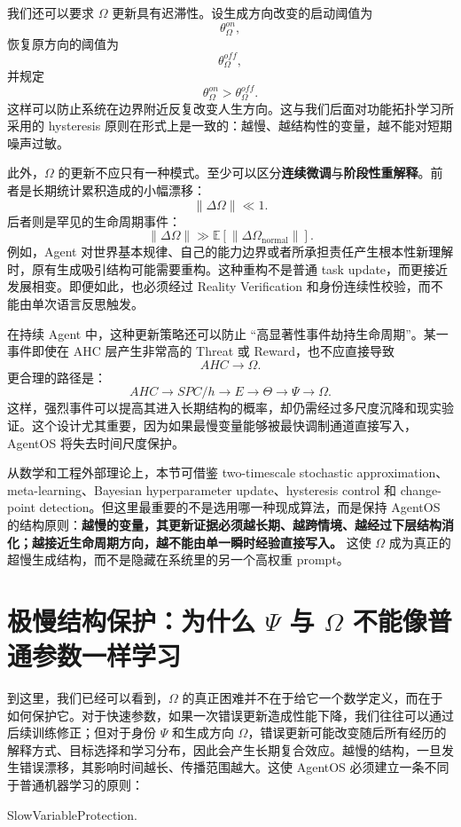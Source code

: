我们还可以要求 $\Omega$ 更新具有迟滞性。设生成方向改变的启动阈值为
\[
\theta_{\Omega}^{on},
\]
恢复原方向的阈值为
\[
\theta_{\Omega}^{off},
\]
并规定
\[
\theta_{\Omega}^{on}
>
\theta_{\Omega}^{off}.
\]
这样可以防止系统在边界附近反复改变人生方向。这与我们后面对功能拓扑学习所采用的 hysteresis 原则在形式上是一致的：越慢、越结构性的变量，越不能对短期噪声过敏。

此外，$\Omega$ 的更新不应只有一种模式。至少可以区分\textbf{连续微调}与\textbf{阶段性重解释}。前者是长期统计累积造成的小幅漂移：
\[
\|\Delta\Omega\|\ll1.
\]
后者则是罕见的生命周期事件：
\[
\|\Delta\Omega\|
\gg
\mathbb E[
\|\Delta\Omega_{\text{normal}}\|
].
\]
例如，Agent 对世界基本规律、自己的能力边界或者所承担责任产生根本性新理解时，原有生成吸引结构可能需要重构。这种重构不是普通 task update，而更接近发展相变。即便如此，也必须经过 Reality Verification 和身份连续性校验，而不能由单次语言反思触发。

在持续 Agent 中，这种更新策略还可以防止 ``高显著性事件劫持生命周期''。某一事件即使在 AHC 层产生非常高的 Threat 或 Reward，也不应直接导致
\[
AHC\rightarrow\Omega.
\]
更合理的路径是：
\[
AHC
\rightarrow
SPC/h
\rightarrow
E
\rightarrow
\Theta
\rightarrow
\Psi
\rightarrow
\Omega.
\]
这样，强烈事件可以提高其进入长期结构的概率，却仍需经过多尺度沉降和现实验证。这个设计尤其重要，因为如果最慢变量能够被最快调制通道直接写入，AgentOS 将失去时间尺度保护。

从数学和工程外部理论上，本节可借鉴 two-timescale stochastic approximation、meta-learning、Bayesian hyperparameter update、hysteresis control 和 change-point detection。但这里最重要的不是选用哪一种现成算法，而是保持 AgentOS 的结构原则：\textbf{越慢的变量，其更新证据必须越长期、越跨情境、越经过下层结构消化；越接近生命周期方向，越不能由单一瞬时经验直接写入。} 这使 $\Omega$ 成为真正的超慢生成结构，而不是隐藏在系统里的另一个高权重 prompt。

\section{极慢结构保护：为什么 $\Psi$ 与 $\Omega$ 不能像普通参数一样学习}

到这里，我们已经可以看到，$\Omega$ 的真正困难并不在于给它一个数学定义，而在于如何保护它。对于快速参数，如果一次错误更新造成性能下降，我们往往可以通过后续训练修正；但对于身份 $\Psi$ 和生成方向 $\Omega$，错误更新可能改变随后所有经历的解释方式、目标选择和学习分布，因此会产生长期复合效应。越慢的结构，一旦发生错误漂移，其影响时间越长、传播范围越大。这使 AgentOS 必须建立一条不同于普通机器学习的原则：
\begin{statementbox}
SlowVariableProtection.
\end{statementbox}

